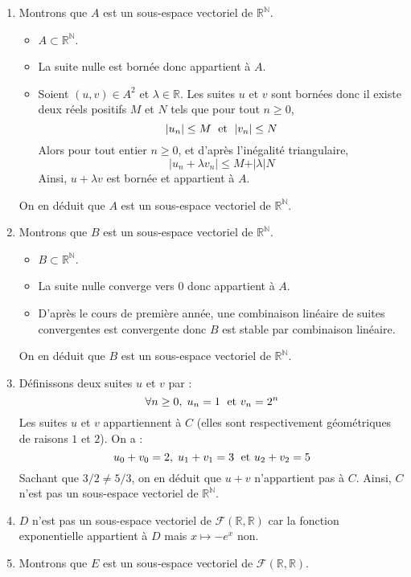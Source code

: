 \documentclass[a4paper,10pt]{report}
\begin{document}
\corr 

\begin{enumerate}
\item Montrons que $A$ est un sous-espace vectoriel de $\mathbb{R}^{\mathbb{N}}$.
\begin{itemize}
\item $A \subset \mathbb{R}^{\mathbb{N}}$.
\item La suite nulle est bornée donc appartient à $A$.
\item Soient $(u,v) \in A^2$ et $\lambda \in \mathbb{R}$. Les suites $u$ et $v$ sont bornées donc il existe deux réels positifs $M$ et $N$ tels que pour tout $n \geq 0$,
$$ \vert u_n \vert \leq M \; \hbox{ et } \; \vert v_n \vert \leq N$$
Alors pour tout entier $n \geq 0$, et d'après l'inégalité triangulaire,
$$ \vert u_n + \lambda v_n \vert \leq M+ \vert \lambda \vert N$$
Ainsi, $u+ \lambda v$ est bornée et appartient à $A$.
\end{itemize}
On en déduit que $A$ est un sous-espace vectoriel de $\mathbb{R}^{\mathbb{N}}$.
\item Montrons que $B$ est un sous-espace vectoriel de $\mathbb{R}^{\mathbb{N}}$.
\begin{itemize}
\item $B \subset \mathbb{R}^{\mathbb{N}}$.
\item La suite nulle converge vers $0$ donc appartient à $A$.
\item D'après le cours de première année, une combinaison linéaire de suites convergentes est convergente donc $B$ est stable par combinaison linéaire.
\end{itemize}
On en déduit que $B$ est un sous-espace vectoriel de $\mathbb{R}^{\mathbb{N}}$.
\item Définissons deux suites $u$ et $v$ par :
$$ \forall n \geq 0, \; u_n = 1 \; \hbox{ et } v_n = 2^n$$
Les suites $u$ et $v$ appartiennent à $C$ (elles sont respectivement géométriques de raisons $1$ et $2$). On a :
$$ u_0+v_0 = 2, \; u_1+v_1 = 3 \; \hbox{ et } u_2+v_2 = 5$$
Sachant que $3/2 \neq 5/3$, on en déduit que $u+v$ n'appartient pas à $C$. Ainsi, $C$ n'est pas un sous-espace vectoriel de $\mathbb{R}^{\mathbb{N}}$.
\item $D$ n'est pas un sous-espace vectoriel de $\mathcal{F}(\mathbb{R}, \mathbb{R})$ car la fonction exponentielle appartient à $D$ mais $x \mapsto -e^x$ non.
\item Montrons que $E$ est un sous-espace vectoriel de $\mathcal{F}(\mathbb{R}, \mathbb{R})$.
\begin{itemize}

\end{itemize}
\end{enumerate}
\end{document}
